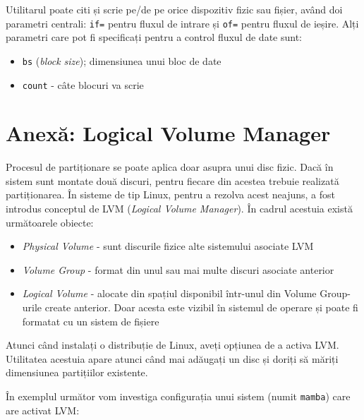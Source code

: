 Utilitarul  poate citi și scrie pe/de pe orice dispozitiv fizic sau fișier, având doi parametri centrali: \texttt{if=} pentru fluxul de intrare și \texttt{of=} pentru fluxul de ieșire.
Alți parametri care pot fi specificați pentru a control fluxul de date sunt:

\begin{itemize}
  \item \texttt{bs} (\textit{block size});
    dimensiunea unui bloc de date
  \item \texttt{count} - câte blocuri va scrie
\end{itemize}

\section{Anexă: Logical Volume Manager}
\label{sec:storage:lvm}

Procesul de partiționare se poate aplica doar asupra unui disc fizic.
Dacă în sistem sunt montate două discuri, pentru fiecare din acestea trebuie realizată partiționarea.
În sisteme de tip Linux, pentru a rezolva acest neajuns, a fost introdus conceptul de LVM  (\textit{Logical Volume Manager}).
În cadrul acestuia există următoarele obiecte:

\begin{itemize}
  \item \textit{Physical Volume} - sunt discurile fizice alte sistemului asociate LVM
  \item \textit{Volume Group} - format din unul sau mai multe discuri asociate anterior
  \item \textit{Logical Volume} - alocate din spațiul disponibil într-unul din Volume Group-urile create anterior.
    Doar acesta este vizibil în sistemul de operare și poate fi formatat cu un sistem de fișiere
\end{itemize}

Atunci când instalați o distribuție de Linux, aveți opțiunea de a activa LVM.
 Utilitatea acestuia apare atunci când mai adăugați un disc și doriți să măriți dimensiunea partițiilor existente.

În exemplul următor vom investiga configurația unui sistem (numit \texttt{mamba}) care are activat LVM:

